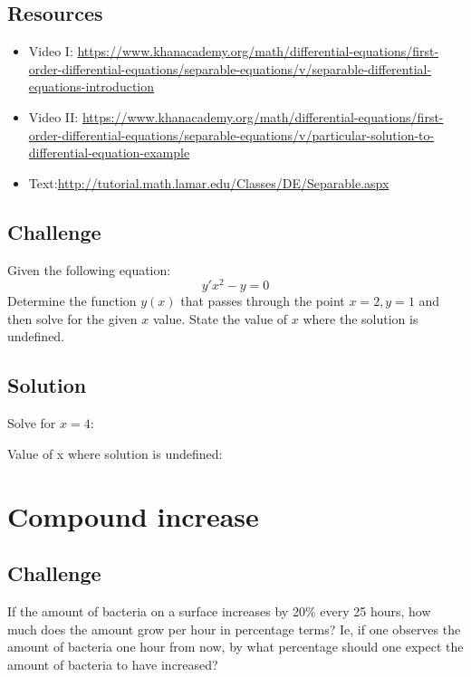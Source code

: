 \subsection*{Resources}
\begin{itemize}
    \item Video I: \url{https://www.khanacademy.org/math/differential-equations/first-order-differential-equations/separable-equations/v/separable-differential-equations-introduction} 
    \item Video II: \url{https://www.khanacademy.org/math/differential-equations/first-order-differential-equations/separable-equations/v/particular-solution-to-differential-equation-example}
    \item Text:\url{http://tutorial.math.lamar.edu/Classes/DE/Separable.aspx}
\end{itemize}

\subsection*{Challenge}
Given the following equation:
\begin{equation}
    y' x^2 - y = 0
\end{equation}
Determine the function $y(x)$ that passes through the point $x=2,y=1$ and then solve for the given $x$ value. State the value of $x$ where the solution is undefined. %

\subsection*{Solution}
Solve for $x=4$:

\six{}


Value of x where solution is undefined:

\six{}


\timebox



\newpage
\section{Compound increase}

\subsection*{Challenge}
If the amount of bacteria on a surface increases by 20\% every 25 hours, how much does the amount grow per hour in percentage terms? Ie, if one observes the amount of bacteria one hour from now, by what percentage should one expect the amount of bacteria to have increased?

